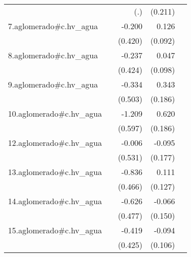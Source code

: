 {\begin{longtable}{l*{4}{D{.}{.}{-1}}}
            &                     &         (.)         &     (0.211)         &                     \\
\addlinespace
7.aglomerado#c.hv\_agua&                     &      -0.200         &       0.126         &                     \\
            &                     &     (0.420)         &     (0.092)         &                     \\
\addlinespace
8.aglomerado#c.hv\_agua&                     &      -0.237         &       0.047         &                     \\
            &                     &     (0.424)         &     (0.098)         &                     \\
\addlinespace
9.aglomerado#c.hv\_agua&                     &      -0.334         &       0.343         &                     \\
            &                     &     (0.503)         &     (0.186)         &                     \\
\addlinespace
10.aglomerado#c.hv\_agua&                     &      -1.209\sym{*}  &       0.620\sym{***}&                     \\
            &                     &     (0.597)         &     (0.186)         &                     \\
\addlinespace
12.aglomerado#c.hv\_agua&                     &      -0.006         &      -0.095         &                     \\
            &                     &     (0.531)         &     (0.177)         &                     \\
\addlinespace
13.aglomerado#c.hv\_agua&                     &      -0.836         &       0.111         &                     \\
            &                     &     (0.466)         &     (0.127)         &                     \\
\addlinespace
14.aglomerado#c.hv\_agua&                     &      -0.626         &      -0.066         &                     \\
            &                     &     (0.477)         &     (0.150)         &                     \\
\addlinespace
15.aglomerado#c.hv\_agua&                     &      -0.419         &      -0.094         &                     \\
            &                     &     (0.425)         &     (0.106)         &                     \\

\end{longtable}}
